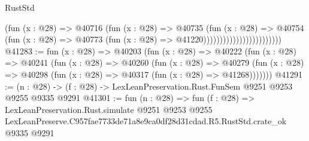 \begin{lexlean}{RustStd}
\begin{coremodule}
                                          (fun (x : @28) =>
                                          @40716
                                            (fun (x : @28) =>
                                            @40735
                                              (fun (x : @28) =>
                                              @40754
                                                (fun (x : @28) =>
                                                @40773
                                                  (fun (x : @28) => @41220))))))))))))))))))))))))
@41283 := fun (x : @28) =>
  @40203
    (fun (x : @28) =>
    @40222
      (fun (x : @28) =>
      @40241
        (fun (x : @28) =>
        @40260
          (fun (x : @28) =>
          @40279 (fun (x : @28) => @40298 (fun (x : @28) => @40317 (fun (x : @28) => @41268)))))))
@41291 := (n : @28) -> (f : @28) -> LexLeanPreservation.Rust.FunSem @9251 @9253 @9255 @9335 @9291
@41301 := fun (n : @28) =>
  fun (f : @28) =>
  LexLeanPreservation.Rust.simulate
    @9251
    @9253
    @9255
    LexLeanPreserve.C957fae7733de71a8e9ca0df28d31cdad.R5.RustStd.crate_ok
    @9335
    @9291
\end{coremodule}
\end{lexlean}
